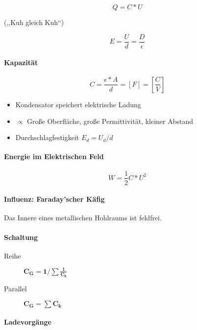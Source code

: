 
$$Q = C * U$$

(,,Kuh gleich Kuh``)

$$E = \frac{U}{d} = \frac{D}{\epsilon}$$

\paragraph{Kapazität}

$$C = \frac{\epsilon * A}{d} = [F] = \left[\frac{C}{V}\right]$$

\begin{itemize}
  \item Kondensator speichert elektrische Ladung
  \item $\propto$ Gro\ss e Oberfläche, gro\ss e Permittivität, kleiner Abstand
  \item Durchschlagfestigkeit $E_d = U_d / d$
\end{itemize}

\paragraph{Energie im Elektrischen Feld}

$$W = \frac{1}{2} C * U^2$$

\paragraph{Influenz: Faraday'scher Käfig}
Das Innere eines metallischen Hohlraums ist feldfrei.

\paragraph{Schaltung}

\begin{description}
  \item[Reihe] $\mathbf{C_G = 1/{\sum \frac{1}{C_k}}}$
  \item[Parallel] $\mathbf{C_G = \sum C_k}$
\end{description}

\paragraph{Ladevorgänge}

